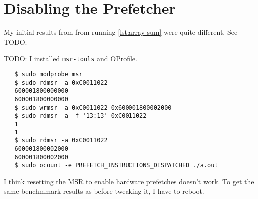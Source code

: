 \section{Disabling the Prefetcher}
My initial results from from running \cref{lst:array-sum} were quite different.  See TODO.

TODO: I installed \texttt{msr-tools} and OProfile.
\begin{verbatim}
   $ sudo modprobe msr
   $ sudo rdmsr -a 0xC0011022
   600001800000000
   600001800000000
   $ sudo wrmsr -a 0xC0011022 0x600001800002000
   $ sudo rdmsr -a -f '13:13' 0xC0011022
   1
   1
   $ sudo rdmsr -a 0xC0011022
   600001800002000
   600001800002000
   $ sudo ocount -e PREFETCH_INSTRUCTIONS_DISPATCHED ./a.out
\end{verbatim}
I think resetting the MSR to enable hardware prefetches doesn't work.  To get the same
benchmmark results as before tweaking it, I have to reboot.

